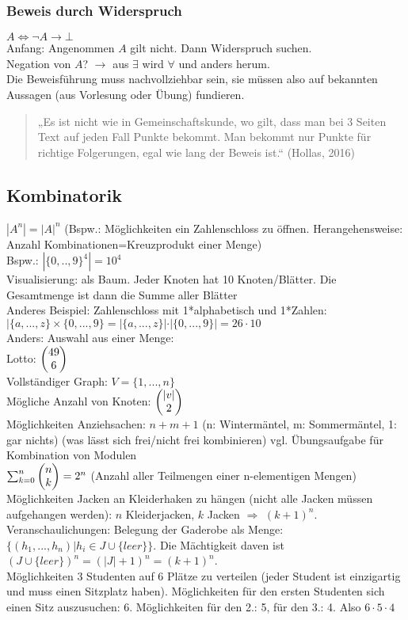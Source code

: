 \subsubsection{Beweis durch Widerspruch}
$A \Leftrightarrow \neg A \to \bot$\\
Anfang: Angenommen $A$ gilt nicht. Dann Widerspruch suchen.\\
Negation von $A$? $\rightarrow$ aus $\exists$ wird $\forall$ und anders herum. \\
Die Beweisführung muss nachvollziehbar sein, sie müssen also auf bekannten Aussagen (aus Vorlesung oder Übung) fundieren.
\begin{quote}
„Es ist nicht wie in Gemeinschaftskunde, wo gilt, dass man bei 3 Seiten Text auf jeden Fall Punkte bekommt. Man bekommt nur Punkte für richtige Folgerungen, egal wie lang der Beweis ist.“ (Hollas, 2016)
\end{quote}

\subsection{Kombinatorik}
$|A^n|=|A|^n$ (Bspw.: Möglichkeiten ein Zahlenschloss zu öffnen. Herangehensweise: Anzahl Kombinationen=Kreuzprodukt einer Menge)\\
Bspw.: $|\{0,..,9\}^4|=10^4$\\
Visualisierung: als Baum. Jeder Knoten hat 10 Knoten/Blätter. Die Gesamtmenge ist dann die Summe aller Blätter\\
Anderes Beispiel: Zahlenschloss mit 1*alphabetisch und 1*Zahlen:\\
$|\{a,...,z\}\times \{0,...,9\}= |\{a,...,z\}| \cdot |\{0,...,9\}| =26\cdot 10$ \bigskip\\
Anders: Auswahl aus einer Menge:\\
Lotto: $\begin{pmatrix}49\\6\end{pmatrix}$\\
Vollständiger Graph: $V=\{1,...,n\}$\\
Mögliche Anzahl von Knoten: $\begin{pmatrix}|v|\\2\end{pmatrix}$\\
Möglichkeiten Anziehsachen: $n+m+1$ (n: Wintermäntel, m: Sommermäntel, 1: gar nichts) (was lässt sich frei/nicht frei kombinieren) vgl. Übungsaufgabe für Kombination von Modulen\\
$\sum_{k=0}^{n}\begin{pmatrix}n\\k\end{pmatrix}=2^n$ (Anzahl aller Teilmengen einer n-elementigen Mengen)\medskip\\
Möglichkeiten Jacken an Kleiderhaken zu hängen (nicht alle Jacken müssen aufgehangen werden): $n$ Kleiderjacken, $k$ Jacken $\Rightarrow$ $(k+1)^n$. Veranschaulichungen: Belegung der Gaderobe als Menge: $\{(h_1,...,h_n)|h_i \in J \cup \{leer\}\}$. Die Mächtigkeit daven ist $(J\cup \{leer\})^n=(|J|+1)^n=(k+1)^n$.\\
Möglichkeiten 3 Studenten auf 6 Plätze zu verteilen (jeder Student ist einzigartig und muss einen Sitzplatz haben). Möglichkeiten für den ersten Studenten sich einen Sitz auszusuchen: 6. Möglichkeiten für den 2.: 5, für den 3.: 4. Also $6\cdot 5 \cdot 4$





\printbibliography
